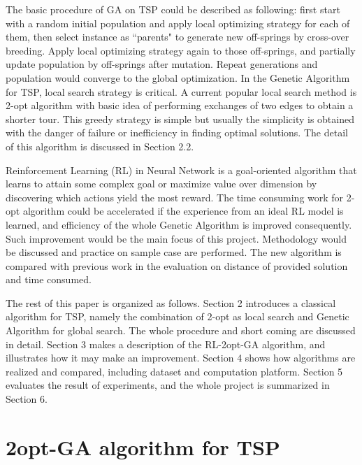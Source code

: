 \documentclass[twocolumn]{article}
\begin{document}
The basic procedure of GA on TSP could be described as following: first start with a random initial population and apply local optimizing strategy for each of them, then select instance as ``parents" to generate new off-springs by cross-over breeding. Apply local optimizing strategy again to those off-springs, and partially update population by off-springs after mutation. Repeat generations and population would converge to the global optimization. In the Genetic Algorithm for TSP, local search strategy is critical. A current popular local search method is  2-opt algorithm\cite{lin1973effective}\cite{helsgaun2000effective} with basic idea of performing exchanges of two edges to obtain a shorter tour. This greedy strategy is simple but usually the simplicity is obtained with the danger of failure or inefficiency in finding optimal solutions. The detail of this algorithm is discussed in Section 2.2. 

Reinforcement Learning (RL) in Neural Network\cite{sutton2018reinforcement} is a goal-oriented algorithm that learns to attain some complex goal or maximize value over dimension by discovering which actions yield the most reward. The time consuming work for 2-opt algorithm could be accelerated if the experience from an ideal RL model is learned, and efficiency of the whole Genetic Algorithm is improved consequently. Such improvement would be the main focus of this project. Methodology would be discussed and practice on sample case are performed. The new algorithm is compared with previous work in the evaluation on distance of provided solution and time consumed. 

The rest of this paper is organized as follows. Section 2 introduces a classical algorithm for TSP, namely the combination of 2-opt as local search and Genetic Algorithm for global search. The whole procedure and short coming are discussed in detail.  Section 3 makes a description of the RL-2opt-GA algorithm, and illustrates how it may make an improvement. Section 4 shows how algorithms are realized and compared, including dataset and computation platform.  Section 5 evaluates the result of experiments, and the whole project is summarized in Section 6.

\section{2opt-GA algorithm for TSP}
\end{document}
